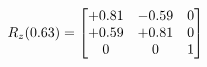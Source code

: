 \documentclass[preview]{standalone}
\begin{document}
\begin{align*}
\special{dvisvgm:raw <g id='unique000'>}R_{z}(0.63) = \begin{bmatrix}+0.81 & -0.59 & 0 \\+0.59 & +0.81 & 0 \\0 & 0 & 1\end{bmatrix}\special{dvisvgm:raw </g>}
\end{align*}
\end{document}
